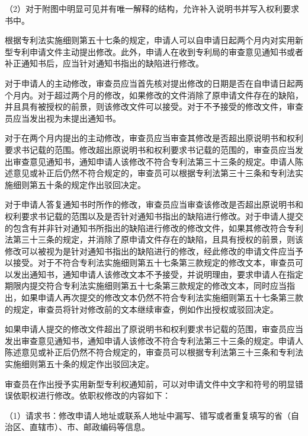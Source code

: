 {\setlength{\parindent}{17.1bp}（2）对于附图中明显可见并有唯一解释的结构，允许补入说明书并写入权利要求书中。\par}

根据专利法实施细则第五十七条的规定，申请人可以自申请日起两个月内对实用新型专利申请文件主动提出修改。此外，申请人在收到专利局的审查意见通知书或者补正通知书后，应当针对通知书指出的缺陷进行修改。

对于申请人的主动修改，审查员应当首先核对提出修改的日期是否在自申请日起两个月内。对于超过两个月的修改，如果修改的文件消除了原申请文件存在的缺陷，并且具有被授权的前景，则该修改文件可以接受。对于不予接受的修改文件，审查员应当发出视为未提出通知书。

对于在两个月内提出的主动修改，审查员应当审查其修改是否超出原说明书和权利要求书记载的范围。修改超出原说明书和权利要求书记载的范围的，审查员应当发出审查意见通知书，通知申请人该修改不符合专利法第三十三条的规定。申请人陈述意见或补正后仍然不符合规定的，审查员可以根据专利法第三十三条和专利法实施细则第五十条的规定作出驳回决定。

对于申请人答复通知书时所作的修改，审查员应当审查该修改是否超出原说明书和权利要求书记载的范围以及是否针对通知书指出的缺陷进行修改。对于申请人提交的包含有并非针对通知书所指出的缺陷进行修改的修改文件，如果其修改符合专利法第三十三条的规定，并消除了原申请文件存在的缺陷，且具有授权的前景，则该修改可以被视为是针对通知书指出的缺陷进行的修改，经此修改的申请文件应当予以接受。对于不符合专利法实施细则第五十七条第三款规定的修改文本，审查员可以发出通知书，通知申请人该修改文本不予接受，并说明理由，要求申请人在指定期限内提交符合专利法实施细则第五十七条第三款规定的修改文本，同时应当指出，如果申请人再次提交的修改文本仍然不符合专利法实施细则第五十七条第三款的规定，审查员将针对修改前的文本继续审查，例如作出授权或驳回决定。

如果申请人提交的修改文件超出了原说明书和权利要求书记载的范围，审查员应当发出审查意见通知书，通知申请人该修改不符合专利法第三十三条的规定。申请人陈述意见或补正后仍然不符合规定的，审查员可以根据专利法第三十三条和专利法实施细则第五十条的规定作出驳回决定。

审查员在作出授予实用新型专利权通知前，可以对申请文件中文字和符号的明显错误依职权进行修改。依职权修改的内容如下：

{\setlength{\parindent}{17.1bp}（1）请求书：修改申请人地址或联系人地址中漏写、错写或者重复填写的省（自治区、直辖市）、市、邮政编码等信息。\par}


